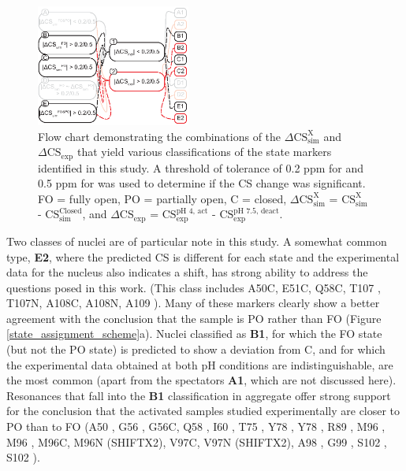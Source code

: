\documentclass[%
 aip,
 amsmath,amssymb,
 preprint,%
]{revtex4-1}
\newcommand{\ca}{\ce{C_\alpha} }
\newcommand{\cb}{\ce{C_\beta} }
\begin{document}
\begin{figure}[tbp]
\includegraphics[width=0.45\textwidth]{figures/Markers_FlowChart_v3-02.eps}
\caption{\label{FlowChart} \scriptsize
    Flow chart demonstrating the combinations of the $\Delta\text{CS}_{\text{sim}}^{\text{X}}$ and $\Delta\text{CS}_{\text{exp}}$ that yield various classifications of the state markers identified in this study. A threshold of tolerance of 0.2 ppm for  and 0.5 ppm for  was used to determine if the CS change was significant. FO = fully open, PO = partially open, C = closed, $\Delta\text{CS}_{\text{sim}}^{\text{X}}$ = $\text{CS}_{\text{sim}}^{\text{X}}$ - $\text{CS}_{\text{sim}}^{\text{Closed}}$, and $\Delta\text{CS}_{\text{exp}}$ = $\text{CS}_{\text{exp}}^{\text{pH } 4\text{, act}}$ - $\text{CS}_{\text{exp}}^{\text{pH } 7.5\text{, deact}}$.}
\end{figure}

Two classes of nuclei are of particular note in this study. A somewhat common type, \textbf{E2}, where the predicted CS is different for each state and the experimental data for the nucleus also indicates a shift, has strong ability to address the questions posed in this work. (This class includes A50C, E51C, Q58C, T107\ca, T107N, A108C, A108N, A109\cb). Many of these markers clearly show a  better agreement with the conclusion that the sample is PO rather than FO (Figure \ref{state_assignment_scheme}a). Nuclei classified as \textbf{B1}, for which the FO state (but not the PO state) is predicted to show a deviation from C, and for which the experimental data obtained at both pH conditions are indistinguishable, are the most common (apart from the spectators \textbf{A1}, which are not discussed here). Resonances that fall into the \textbf{B1} classification in aggregate offer strong support for the conclusion that the activated samples studied experimentally are closer to PO than to FO (A50\ca, G56\ca, G56C, Q58\ca, I60\cb, T75\cb, Y78\ca, Y78\cb, R89\ca, M96\ca, M96\cb, M96C, M96N (SHIFTX2), V97C, V97N (SHIFTX2), A98\cb, G99\ca, S102\ca, S102\cb).
 
\end{document}
